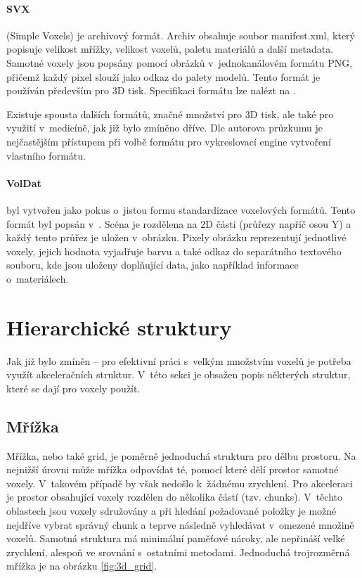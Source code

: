\paragraph{SVX} (Simple Voxels) je archivový formát. Archiv obsahuje soubor manifest.xml, který popisuje velikost mřížky, velikost voxelů, paletu materiálů a další metadata. Samotné voxely jsou popsány pomocí obrázků v~jednokanálovém formátu PNG, přičemž každý pixel slouží jako odkaz do palety modelů. Tento formát je používán především pro 3D tisk. Specifikaci formátu lze nalézt na \cite{svx_format_2014}.

Existuje spousta dalších formátů, značné množství pro 3D tisk, ale také pro využití v~medicíně, jak již bylo zmíněno dříve. Dle autorova průzkumu je nejčastějším přístupem při volbě formátu pro vykreslovací engine vytvoření vlastního formátu.

\paragraph{VolDat} byl vytvořen jako pokus o~jistou formu standardizace voxelových formátů. Tento formát byl popsán v~\cite{williams_2013}. Scéna je rozdělena na 2D části (průřezy napříč osou Y) a každý tento průřez je uložen v~obrázku. Pixely obrázku reprezentují jednotlivé voxely, jejich hodnota vyjadřuje barvu a také odkaz do separátního textového souboru, kde jsou uloženy doplňující data, jako například informace o~materiálech.


\section{Hierarchické struktury}
Jak již bylo zmíněn -- pro efektivní práci s~velkým množstvím voxelů je potřeba využít akceleračních struktur. V~této sekci je obsažen popis některých struktur, které se dají pro voxely použít.

\subsection{Mřížka}
Mřížka, nebo také grid, je poměrně jednoduchá struktura pro dělbu prostoru. Na nejnižší úrovni může mřížka odpovídat té, pomocí které dělí prostor samotné voxely. V~takovém případě by však nedošlo k~žádnému zrychlení. Pro akceleraci je prostor obsahující voxely rozdělen do několika částí (tzv. chunks). V~těchto oblastech jsou voxely sdružovány a při hledání požadované položky je možné nejdříve vybrat správný chunk a teprve následně vyhledávat v~omezené množině voxelů. Samotná struktura má minimální paměťové nároky, ale nepřináší velké zrychlení, alespoň ve srovnání s~ostatními metodami. Jednoduchá trojrozměrná mřížka je na obrázku \ref{fig:3d_grid}.

